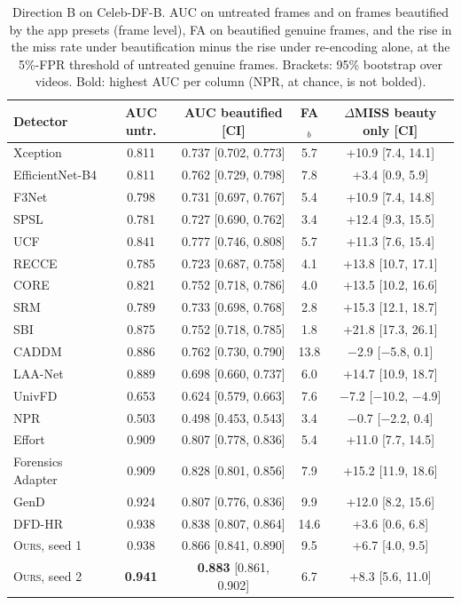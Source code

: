 \documentclass[journal]{IEEEtran}  %
\newcommand{\ours}{\textsc{Ours}}
\begin{document}
\begin{table}[t]
\centering
\caption{Direction B on Celeb-DF-B. AUC on untreated frames and on frames beautified by the app presets (frame level), FA on
beautified genuine frames, and the rise in the miss rate under beautification minus the rise under re-encoding alone, at the
5\%-FPR threshold of untreated genuine frames. Brackets: 95\% bootstrap over videos. Bold: highest AUC per column (NPR, at chance, is not bolded).}
\label{tab:dirB}
\scriptsize
\setlength{\tabcolsep}{2.5pt}
\begin{tabular}{@{}l c c c c@{}}
\toprule
Detector & AUC untr. & AUC beautified [CI] & FA$_b$ & $\Delta$MISS beauty only [CI] \\
\midrule
Xception & 0.811 & 0.737 [0.702, 0.773] & 5.7 & +10.9 [7.4, 14.1] \\
EfficientNet-B4 & 0.811 & 0.762 [0.729, 0.798] & 7.8 & +3.4 [0.9, 5.9] \\
F3Net & 0.798 & 0.731 [0.697, 0.767] & 5.4 & +10.9 [7.4, 14.8] \\
SPSL & 0.781 & 0.727 [0.690, 0.762] & 3.4 & +12.4 [9.3, 15.5] \\
UCF & 0.841 & 0.777 [0.746, 0.808] & 5.7 & +11.3 [7.6, 15.4] \\
RECCE & 0.785 & 0.723 [0.687, 0.758] & 4.1 & +13.8 [10.7, 17.1] \\
CORE & 0.821 & 0.752 [0.718, 0.786] & 4.0 & +13.5 [10.2, 16.6] \\
SRM & 0.789 & 0.733 [0.698, 0.768] & 2.8 & +15.3 [12.1, 18.7] \\
SBI & 0.875 & 0.752 [0.718, 0.785] & 1.8 & +21.8 [17.3, 26.1] \\
CADDM & 0.886 & 0.762 [0.730, 0.790] & 13.8 & $-$2.9 [$-$5.8, 0.1] \\
LAA-Net & 0.889 & 0.698 [0.660, 0.737] & 6.0 & +14.7 [10.9, 18.7] \\
UnivFD & 0.653 & 0.624 [0.579, 0.663] & 7.6 & $-$7.2 [$-$10.2, $-$4.9] \\
NPR & 0.503 & 0.498 [0.453, 0.543] & 3.4 & $-$0.7 [$-$2.2, 0.4] \\
Effort & 0.909 & 0.807 [0.778, 0.836] & 5.4 & +11.0 [7.7, 14.5] \\
Forensics Adapter & 0.909 & 0.828 [0.801, 0.856] & 7.9 & +15.2 [11.9, 18.6] \\
GenD & 0.924 & 0.807 [0.776, 0.836] & 9.9 & +12.0 [8.2, 15.6] \\
DFD-HR & 0.938 & 0.838 [0.807, 0.864] & 14.6 & +3.6 [0.6, 6.8] \\
\midrule
\ours{}, seed 1 & 0.938 & 0.866 [0.841, 0.890] & 9.5 & +6.7 [4.0, 9.5] \\
\ours{}, seed 2 & \textbf{0.941} & \textbf{0.883} [0.861, 0.902] & 6.7 & +8.3 [5.6, 11.0] \\
\bottomrule
\end{tabular}
\end{table}
\end{document}
